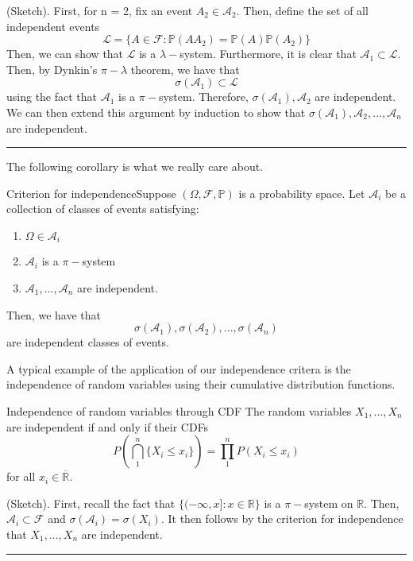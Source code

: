 \documentclass[twoside]{article}
\newenvironment{proof}{{\bf Proof:}}{\hfill\rule{2mm}{2mm}}
\newcommand{\algebra}{\mathcal{A}}
\newcommand{\sigmalgebra}{\mathcal{F}}
\newcommand{\prob}{\mathbb{P}}
\begin{document}
\begin{proof}(Sketch). First, for n = 2, fix an event $A_2 \in \algebra_2.$ Then, define the set of all independent events 
$$
\mathcal{L} = \{A \in \sigmalgebra: \prob(A A_2) = \prob(A)\prob(A_2) \}
$$
Then, we can show that $\mathcal{L}$ is a $\lambda-$system. Furthermore, it is clear that $\algebra_1 \subset \mathcal{L}$. Then, by Dynkin's $\pi-\lambda$ theorem, we have that 
$$
\sigma(\algebra_1) \subset \mathcal{L}
$$
using the fact that $\algebra_1$ is a $\pi-$system. Therefore, $\sigma(\algebra_1), \algebra_2$ are independent. We can then extend this argument by induction to show that $\sigma(\algebra_1), \algebra_2,...,\algebra_n$ are independent. 
\end{proof}

The following corollary is what we really care about.

\begin{theorem_exam}{Criterion for independence}{}Suppose $(\Omega, \sigmalgebra, \prob)$ is a probability space. Let $\mathcal{A}_i$ be a collection of classes of events satisfying:
\begin{enumerate}
\item $\Omega \in \mathcal{A}_i$
\item $\mathcal{A}_i$ is a $\pi-$system
\item $\mathcal{A}_1,...,\mathcal{A}_n$ are independent.
\end{enumerate}
Then, we have that
$$
\sigma(\mathcal{A}_1),\sigma(\mathcal{A}_2),...,\sigma(\mathcal{A}_n)
$$
are independent classes of events.
\end{theorem_exam}


A typical example of the application of our independence critera is the independence of random variables using their cumulative distribution functions.

\begin{theorem_exam}{Independence of random variables through CDF}{} The random variables $X_1,...,X_n$ are independent if and only if their CDFs
$$
P(\bigcap_{1}^n\{X_i \leq x_i\}) = \prod_1^nP(X_i \leq x_i)
$$
for all $x_i \in \overline{\mathbb{R}}.$
\end{theorem_exam}

\begin{proof} (Sketch). First, recall the fact that $\{(-\infty,x]: x \in \mathbb{R}\}$ is a $\pi-$system on $\mathbb{R}.$ Then, $\algebra_i \subset \sigmalgebra$ and $\sigma(\algebra_i) = \sigma(X_i).$ It then follows by the criterion for independence that $X_1,...,X_n$ are independent.
\end{proof}
\end{document}
